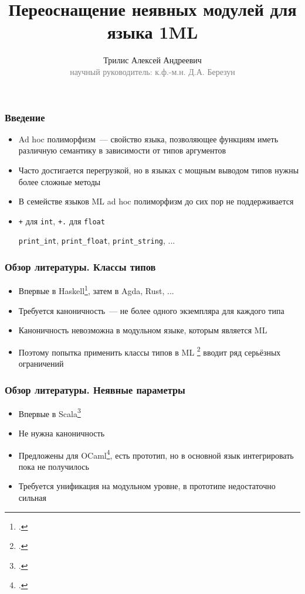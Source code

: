 \documentclass{beamer}
\begin{document}
\title[Неявные модули в 1ML]{Переоснащение неявных модулей для языка 1ML }
\author[Трилис А.А.]{Трилис Алексей Андреевич\\{\footnotesize\textcolor{gray}{научный руководитель: к.ф.-м.н. Д.А. Березун}}}
\frame{\titlepage}

\begin{frame}\frametitle{Введение}
\begin{itemize}
  \item Ad hoc полиморфизм~--- свойство языка, позволяющее функциям иметь различную семантику в зависимости от типов аргументов
  \item Часто достигается перегрузкой, но в языках с мощным выводом типов нужны более сложные методы
  \item В семействе языков ML ad hoc полиморфизм до сих пор не поддерживается
  \item \texttt{+} для \texttt{int}, \texttt{+.} для \texttt{float}

  \texttt{print\_int}, \texttt{print\_float}, \texttt{print\_string}, ...
\end{itemize}
\end{frame}

\lstset{language=haskell}
\begin{frame}[fragile]\frametitle{Обзор литературы. Классы типов}
\begin{itemize}
  \item Впервые в Haskell\footcite{adhoc}, затем в Agda, Rust, ...
  \item Требуется каноничность~--- не более одного экземпляра для каждого типа
  \item Каноничность невозможна в модульном языке, которым является ML
  \item Поэтому попытка применить классы типов в ML \footcite{ml_typeclasses} вводит ряд серьёзных ограничений
\end{itemize}
\end{frame}

\begin{frame}\frametitle{Обзор литературы. Неявные параметры}
\begin{itemize}
  \item Впервые в Scala\footcite{implicits}
  \item Не нужна каноничность
  \item Предложены для OCaml\footcite{white}, есть прототип, но в основной язык интегрировать пока не получилось
  \item Требуется унификация на модульном уровне, в прототипе недостаточно сильная
\end{itemize}
\end{frame}
\end{document}
